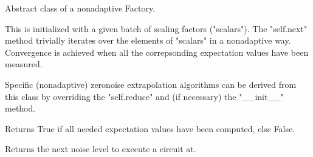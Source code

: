 \documentclass[letterpaper,10pt,english]{sphinxmanual}
\begin{document}
\begin{fulllineitems}
\label{\detokenize{apidoc:mitiq.factories.BatchedFactory}}
Abstract class of a non\sphinxhyphen{}adaptive Factory.

This is initialized with a given batch of scaling factors ("scalars").
The "self.next" method trivially iterates over the elements of "scalars"
in a non\sphinxhyphen{}adaptive way.
Convergence is achieved when all the correpsonding expectation values have been measured.

Specific (non\sphinxhyphen{}adaptive) zero\sphinxhyphen{}noise extrapolation algorithms can be derived from this class by
overriding the "self.reduce" and (if necessary) the "\_\_init\_\_" method.

\begin{fulllineitems}
\label{\detokenize{apidoc:mitiq.factories.BatchedFactory.is_converged}}
Returns True if all needed expectation values have been computed, else False.

\end{fulllineitems}


\begin{fulllineitems}
\label{\detokenize{apidoc:mitiq.factories.BatchedFactory.next}}
Returns the next noise level to execute a circuit at.

\end{fulllineitems}


\end{fulllineitems}

\end{document}
